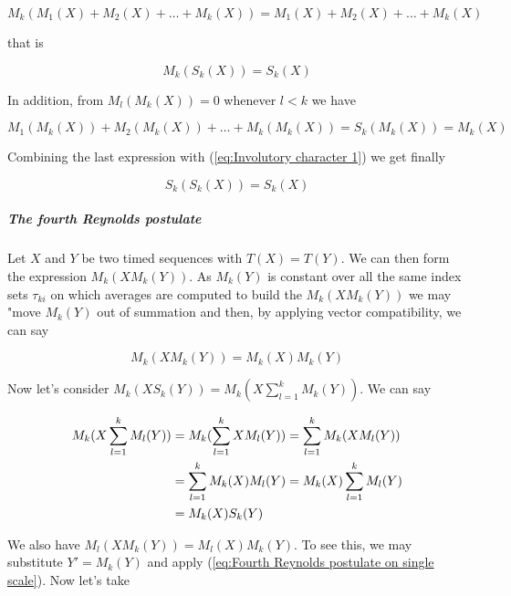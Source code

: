 \documentclass[a4paper,10pt]{book}
\begin{document}
\begin{equation}
	M_{k}(M_{1}(X) + M_{2}(X) + \ldots + M_{k}(X)) = M_{1}(X) + M_{2}(X) + \ldots + M_{k}(X)
\end{equation}

\noindent that is

\begin{equation}\label{eq:Involutory character 1}
	M_{k}(S_{k}(X)) = S_{k}(X)
\end{equation}

In addition, from $M_{l}(M_{k}(X)) = 0$ whenever $l < k$ we have

\begin{equation}
	M_{1}(M_{k}(X)) + M_{2}(M_{k}(X)) + \ldots + M_{k}(M_{k}(X)) = S_{k}(M_{k}(X)) = M_{k}(X)
\end{equation}

Combining the last expression with (\ref{eq:Involutory character 1}) we get finally

\begin{equation}\label{eq:Involutory character 2}
	S_{k}(S_{k}(X)) = S_{k}(X)
\end{equation}


\subparagraph{The fourth Reynolds postulate}

Let $X$ and $Y$ be two timed sequences with $T(X) = T(Y)$. We can then form the expression $M_{k}(X M_{k}(Y))$. As $M_{k}(Y)$ is constant over all the same index sets $\tau_{ki}$ on which averages are computed to build the $M_{k}(X M_{k}(Y))$ we may "move $M_{k}(Y)$ out of summation and then, by applying vector compatibility, we can say

\begin{equation}\label{eq:Fourth Reynolds postulate on single scale}
	M_{k}(X M_{k}(Y)) = M_{k}(X) M_{k}(Y)
\end{equation}

\noindent Now let's consider $M_{k}(X S_{k}(Y)) = M_{k}(X \sum_{l=1}^{k} M_{k}(Y))$. We can say

\begin{align}
	M_{k}(X \sum_{l=1}^{k} M_{l}(Y)) &= M_{k}(\sum_{l=1}^{k} X M_{l}(Y)) = \sum_{l=1}^{k} M_{k}(X M_{l}(Y)) \notag\\
	&= \sum_{l=1}^{k} M_{k}(X) M_{l}(Y) = M_{k}(X) \sum_{l=1}^{k} M_{l}(Y) \notag \\
	&= M_{k}(X) S_{k}(Y) \label{eq:Fourth Reynolds postulate on single scale fifty-fifty}
\end{align}

We also have $M_{l}(X M_{k}(Y)) = M_{l}(X) M_{k}(Y)$. To see this, we may substitute $Y' = M_{k}(Y)$ and apply (\ref{eq:Fourth Reynolds postulate on single scale}). Now let's take
\end{document}
